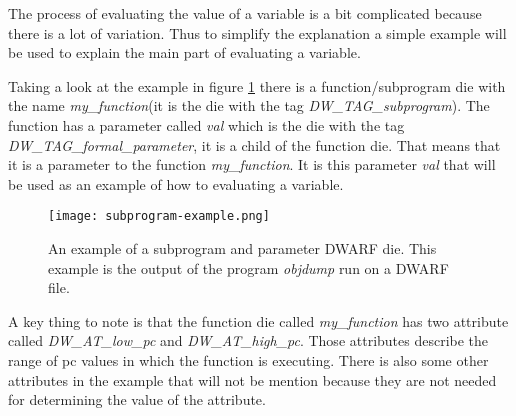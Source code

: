  


The process of evaluating the value of a variable is a bit complicated because there is a lot of variation.
Thus to simplify the explanation a simple example will be used to explain the main part of evaluating a variable.


Taking a look at the example in figure \ref{fig:subprogramexample} there is a function/subprogram \gls{die} with the name \emph{my\_function}(it is the \gls{die} with the tag \emph{DW\_TAG\_subprogram}).
The function has a parameter called \emph{val} which is the \gls{die} with the tag \emph{DW\_TAG\_formal\_parameter}, it is a child of the function \gls{die}.
That means that it is a parameter to the function \emph{my\_function}.
It is this parameter \emph{val} that will be used as an example of how to evaluating a variable.


\begin{figure}[h]
	\centering
	\texttt{[image: subprogram-example.png]}
	\caption{An example of a subprogram and parameter \gls{DWARF} \gls{die}. This example is the output of the program \emph{objdump} run on a \gls{DWARF} file.}
	\label{fig:subprogramexample}
\end{figure}


A key thing to note is that the function \gls{die} called \emph{my\_function} has two attribute called \emph{DW\_AT\_low\_pc} and \emph{DW\_AT\_high\_pc}.
Those attributes describe the range of \gls{pc} values in which the function is executing.
There is also some other attributes in the example that will not be mention because they are not needed for determining the value of the attribute.





